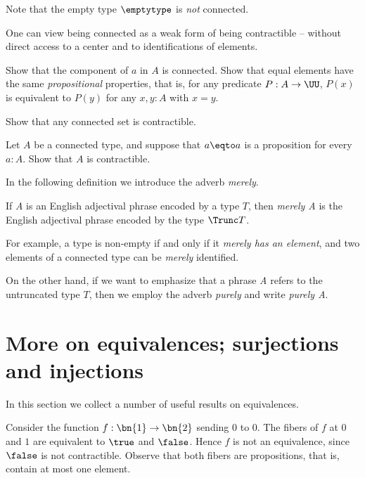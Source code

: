 Note that the empty type $\emptytype$ is \emph{not} connected.

One can view being connected as a weak form
of being contractible -- without direct access to a center and to
identifications of elements.

\begin{xca}\label{xca:component-connected}
  Show that the component of $a$ in $A$ is connected.
  Show that equal elements have the same
  \emph{propositional} properties, that is,
  for any predicate $P:A\to\UU$, $P(x)$ is equivalent
  to $P(y)$ for any $x,y:A$ with $x=y$.
\end{xca}

\begin{xca}\label{xca:prop-set-trivia-2}
  Show that any connected set is contractible.
\end{xca}

\begin{xca}\label{xca:connected-trivia}
Let $A$ be a connected type, and suppose that $a \eqto a$ is a proposition for every $a:A$.
Show that $A$ is contractible.
\end{xca}

In the following definition we introduce the adverb \emph{merely}.

\begin{definition}\label{def:merely}
  If \emph{A} is an English adjectival phrase encoded by a type $T$,
  then \emph{merely A} is the English adjectival phrase encoded by the type $\Trunc T$.
\end{definition}

For example, a type is non-empty if and only if it \emph{merely has an element}, and two elements of a connected type can be \emph{merely} identified.

On the other hand, if we want to emphasize that a phrase \emph{A} refers to the
untruncated type $T$, then we employ the adverb \emph{purely}
and write \emph{purely A}.


\section{More on equivalences; surjections and injections}
\label{sec:more-on-equivalences}

In this section we collect a number of useful results on equivalences.

Consider the function $f:\bn{1}\to\bn{2}$ sending $0$ to $0$.
The fibers of $f$ at $0$ and $1$ are equivalent to $\true$ and $\false$.
Hence $f$ is not an equivalence, since $\false$ is not contractible. 
Observe that both fibers are propositions, that is, contain at most one element.

